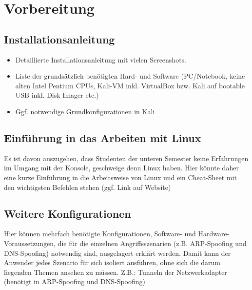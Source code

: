 \chapter{Vorbereitung}

\section{Installationsanleitung}
\begin{itemize}
	\item Detaillierte Installationsanleitung mit vielen Screenshots.
	\item Liste der grundsätzlich benötigten Hard- und Software (PC/Notebook, keine alten Intel Pentium CPUs, Kali-VM inkl. VirtualBox bzw. Kali auf bootable USB inkl. Disk Imager etc.)
	\item Ggf. notwendige Grundkonfigurationen in Kali
\end{itemize}

\section{Einführung in das Arbeiten mit Linux}
Es ist davon auszugehen, dass Studenten der unteren Semester keine Erfahrungen im Umgang mit der Konsole, geschweige denn Linux haben. Hier könnte daher eine kurze Einführung in die Arbeitsweise von Linux und ein Cheat-Sheet mit den wichtigsten Befehlen stehen (ggf. Link auf Website)

\section{Weitere Konfigurationen}
Hier können mehrfach benötigte Konfigurationen, Software- und Hardware-Voraussetzungen, die für die einzelnen Angriffsszenarien (z.B. ARP-Spoofing und DNS-Spoofing) notwendig sind, ausgelagert erklärt werden. Damit kann der Anwender jedes Szenario für sich isoliert ausführen, ohne sich die darum liegenden Themen ansehen zu müssen. Z.B.: Tunneln der Netzwerkadapter (benötigt in ARP-Spoofing und DNS-Spoofing)
